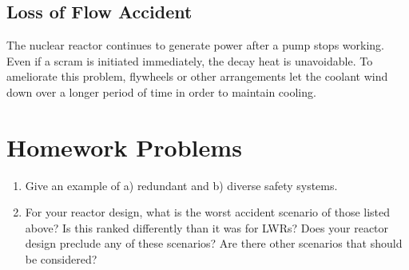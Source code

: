 \subsection{Loss of Flow Accident}
The nuclear reactor continues to generate power after a pump stops working. Even if a scram is initiated immediately, the decay heat is unavoidable.
To ameliorate this problem, flywheels or other arrangements let the coolant wind down over a longer period of time in order to maintain cooling.

\section{Homework Problems}
\begin{enumerate}
  \item Give an example of a) redundant and b) diverse safety systems.
  \item For your reactor design, what is the worst accident scenario of those listed above? 
        Is this ranked differently than it was for LWRs?
        Does your reactor design preclude any of these scenarios?
        Are there other scenarios that should be considered?
\end{enumerate}